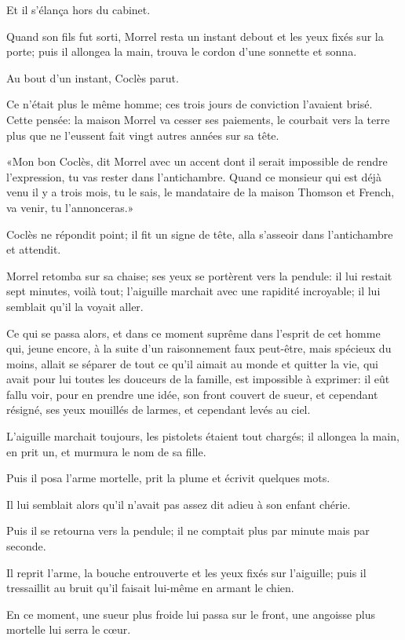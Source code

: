 Et il s'élança hors du cabinet.

Quand son fils fut sorti, Morrel resta un instant debout et les yeux fixés sur la porte; puis il allongea la main, trouva le cordon d'une sonnette et sonna.

Au bout d'un instant, Coclès parut.

Ce n'était plus le même homme; ces trois jours de conviction l'avaient brisé. Cette pensée: la maison Morrel va cesser ses paiements, le courbait vers la terre plus que ne l'eussent fait vingt autres années sur sa tête.

«Mon bon Coclès, dit Morrel avec un accent dont il serait impossible de rendre l'expression, tu vas rester dans l'antichambre. Quand ce monsieur qui est déjà venu il y a trois mois, tu le sais, le mandataire de la maison Thomson et French, va venir, tu l'annonceras.»

Coclès ne répondit point; il fit un signe de tête, alla s'asseoir dans l'antichambre et attendit.

Morrel retomba sur sa chaise; ses yeux se portèrent vers la pendule: il lui restait sept minutes, voilà tout; l'aiguille marchait avec une rapidité incroyable; il lui semblait qu'il la voyait aller.

Ce qui se passa alors, et dans ce moment suprême dans l'esprit de cet homme qui, jeune encore, à la suite d'un raisonnement faux peut-être, mais spécieux du moins, allait se séparer de tout ce qu'il aimait au monde et quitter la vie, qui avait pour lui toutes les douceurs de la famille, est impossible à exprimer: il eût fallu voir, pour en prendre une idée, son front couvert de sueur, et cependant résigné, ses yeux mouillés de larmes, et cependant levés au ciel.

L'aiguille marchait toujours, les pistolets étaient tout chargés; il allongea la main, en prit un, et murmura le nom de sa fille.

Puis il posa l'arme mortelle, prit la plume et écrivit quelques mots.

Il lui semblait alors qu'il n'avait pas assez dit adieu à son enfant chérie.

Puis il se retourna vers la pendule; il ne comptait plus par minute mais par seconde.

Il reprit l'arme, la bouche entrouverte et les yeux fixés sur l'aiguille; puis il tressaillit au bruit qu'il faisait lui-même en armant le chien.

En ce moment, une sueur plus froide lui passa sur le front, une angoisse plus mortelle lui serra le cœur.

